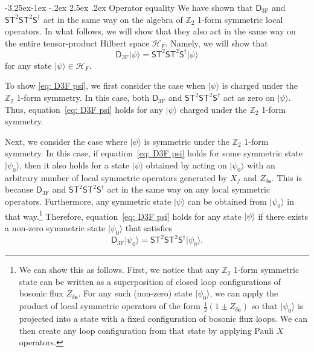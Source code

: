 \documentclass[aps,twocolumn,prx,floatfix,preprintnumbers, nofootinbib,10pt]{revtex4-2}
\makeatletter
\numberwithin{equation}{section}
\theoremstyle{definition}
\theoremstyle{remark}
\theoremstyle{claim}
\renewcommand\subsubsection{\@startsection{subsubsection}{3}{\z@}%
                                     {-3.25ex\@plus -1ex \@minus -.2ex}%
                                     {2.5ex \@plus .2ex}%
                                     {\centering\itshape\bfseries\small}}
\def\ket#1{{|{#1}\rangle}}
\makeatother
\begin{document}
\subsubsection{Operator equality}
We have shown that $\mathsf{D}_\text{3F}$ and $\mathsf{S}\mathsf{T}^2\mathsf{S}\mathsf{T}^2\mathsf{S}^\dag$ act in the same way on the algebra of $\mathbb{Z}_2$ 1-form symmetric local operators.
In what follows, we will show that they also act in the same way on the entire tensor-product Hilbert space $\mathcal{H}_F$.
Namely, we will show that 
\begin{equation}
\mathsf{D}_\text{3F} \ket{\psi} = \mathsf{S}\mathsf{T}^2\mathsf{S}\mathsf{T}^2\mathsf{S}^{\dagger} \ket{\psi}
\label{eq: D3F psi}
\end{equation}
for any state $\ket{\psi} \in \mathcal{H}_F$.

To show \eqref{eq: D3F psi}, we first consider the case when $\ket{\psi}$ is charged under the $\mathbb{Z}_2$ 1-form symmetry.
In this case, both $\mathsf{D}_\text{3F}$ and $\mathsf{S}\mathsf{T}^2\mathsf{S}\mathsf{T}^2\mathsf{S}^{\dagger}$ act as zero on $\ket{\psi}$.
Thus, equation~\eqref{eq: D3F psi} holds for any $\ket{\psi}$ charged under the $\mathbb{Z}_2$ 1-form symmetry.

Next, we consider the case where $\ket{\psi}$ is symmetric under the $\mathbb{Z}_2$ 1-form symmetry.
In this case, if equation~\eqref{eq: D3F psi} holds for some symmetric state $\ket{\psi_0}$, then it also holds for a state $\ket{\psi}$ obtained by acting on $\ket{\psi_0}$ with an arbitrary number of local symmetric operators generated by $X_f$ and $Z_{\delta \bm{e}}$.
This is because $\mathsf{D}_\text{3F}$ and $\mathsf{S}\mathsf{T}^2\mathsf{S}\mathsf{T}^2\mathsf{S}^{\dagger}$ act in the same way on any local symmetric operators.
Furthermore, any symmetric state $\ket{\psi}$ can be obtained from $\ket{\psi_0}$ in that way.\footnote{We can show this as follows. First, we notice that any $\mathbb{Z}_2$ 1-form symmetric state can be written as a superposition of closed loop configurations of bosonic flux $Z_{\delta \bm{e}}$. For any such (non-zero) state $\ket{\psi_0}$, we can apply the product of local symmetric operators of the form $\frac{1}{2}(1 \pm Z_{\delta \bm{e}})$ so that $\ket{\psi_0}$ is projected into a state with a fixed configuration of bosonic flux loops. We can then create any loop configuration from that state by applying Pauli $X$ operators.}
Therefore, equation~\eqref{eq: D3F psi} holds for any state $\ket{\psi}$ if there exists a non-zero symmetric state $\ket{\psi_0}$ that satisfies
\begin{equation}
\mathsf{D}_\text{3F}\ket{\psi_0} = \mathsf{S}\mathsf{T}^2\mathsf{S}\mathsf{T}^2\mathsf{S}^{\dagger} \ket{\psi_0}.
\label{eq: D3F psi0}
\end{equation}
\end{document}
